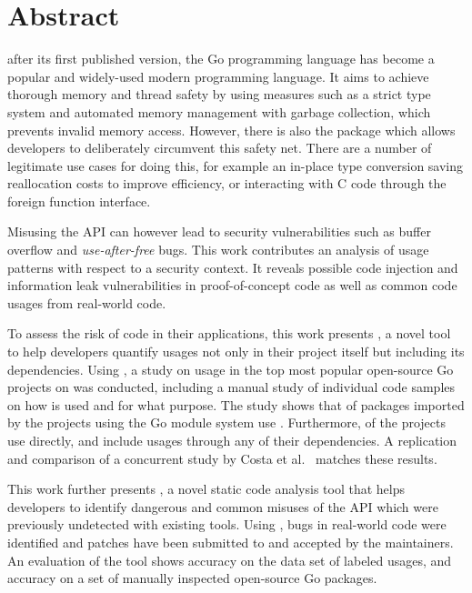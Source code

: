 \chapter*{Abstract}

 after its first published version, the Go programming language has become a popular and
widely-used modern programming language.
It aims to achieve thorough memory and thread safety by using measures such as a strict type system and automated memory
management with garbage collection, which prevents invalid memory access.
However, there is also the \unsafe{} package which allows developers to deliberately circumvent this safety net.
There are a number of legitimate use cases for doing this, for example an in-place type conversion saving reallocation
costs to improve efficiency, or interacting with C code through the foreign function interface.

Misusing the \unsafe{} API can however lead to security vulnerabilities such as buffer overflow and
\textit{use-after-free} bugs.
This work contributes an analysis of \unsafe{} usage patterns with respect to a security context.
It reveals possible code injection and information leak vulnerabilities in proof-of-concept code as well as common code
usages from real-world code.

To assess the risk of \unsafe{} code in their applications, this work presents \toolGeiger{}, a novel tool to help
developers quantify \unsafe{} usages not only in their project itself but including its dependencies.
Using \toolGeiger{}, a study on \unsafe{} usage in the top \projsTotal{} most popular open-source Go projects on
\github{} was conducted, including a manual study of \numberLabeledCodeSnippets{} individual code samples on how
\unsafe{} is used and for what purpose.
The study shows that \percentageUnsafePackages{} of packages imported by the projects using the Go module system use
\unsafe{}.
Furthermore, \percentageUnsafeProjects{} of the projects use \unsafe{} directly, and
\percentageUnsafeTransitiveWithDependencies{} include \unsafe{} usages through any of their dependencies.
A replication and comparison of a concurrent study by Costa et al.~\cite{costa2020} matches these results.

This work further presents \toolSafer{}, a novel static code analysis tool that helps developers to identify
 dangerous and common misuses of the \unsafe{} API which were previously undetected with existing tools.
Using \toolSafer{}, \numberBugsFixed{} bugs in real-world code were identified and patches have been submitted to and
accepted by the maintainers.
An evaluation of the tool shows \goSaferEvaluationDatasetGosaferAccuracy{} accuracy on the data set of labeled \unsafe{}
usages, and \goSaferEvaluationPackagesGosaferAccuracy{} accuracy on a set of manually inspected open-source Go packages.


